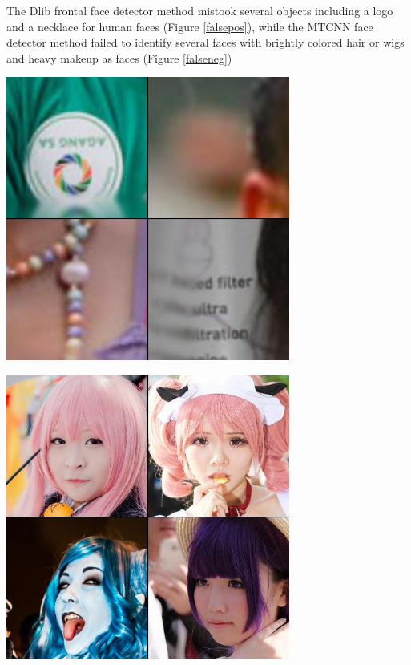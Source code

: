 \documentclass[11pt, letterpaper]{article}
\newenvironment{Figure}
  {\par\medskip\noindent\minipage{\linewidth}}
  {\endminipage\par\medskip}
\begin{document}
\begin{multicols}{2}
  The Dlib frontal face detector method mistook several objects including a logo
  and a necklace for human faces (Figure \ref{falsepos}), while the MTCNN face
  detector method failed to identify several faces with brightly colored hair or
  wigs and heavy makeup as faces (Figure \ref{falseneg})

  \begin{Figure}
    \centering
    \includegraphics[width=0.7\textwidth]{figures/false-positives.jpg}
    \label{falsepos}
  \end{Figure}

  \begin{Figure}
    \centering
    \includegraphics[width=0.7\textwidth]{figures/false-negatives.jpg}
    \label{falseneg}
  \end{Figure}


\end{multicols}
\end{document}
